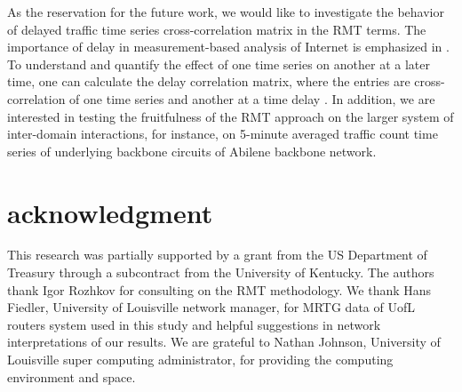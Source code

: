 \documentclass{IEEEtran}
\begin{document}
As the reservation for the future work, we would like to investigate
the behavior of delayed traffic time series cross-correlation matrix
 in the RMT terms. The importance of delay in measurement-based
analysis of Internet is emphasized in \cite{Zhang}. To understand
and quantify the effect of one time series on another at a later time,
one can calculate the delay correlation matrix, where the entries
are cross-correlation of one time series and another at a time delay
 \cite{Mayya}. In addition, we are interested in testing the
fruitfulness of the RMT approach on the larger system of inter-domain
interactions, for instance, on 5-minute averaged traffic count time
series of underlying backbone circuits of Abilene backbone network. 


\section*{acknowledgment}

This research was partially supported by a grant from the US Department
of Treasury through a subcontract from the University of Kentucky.
The authors thank Igor Rozhkov for consulting on the RMT methodology.
We thank Hans Fiedler, University of Louisville network manager, for
MRTG data of UofL routers system used in this study and helpful suggestions
in network interpretations of our results. We are grateful to Nathan
Johnson, University of Louisville super computing administrator, for
providing the computing environment and space.
\end{document}
